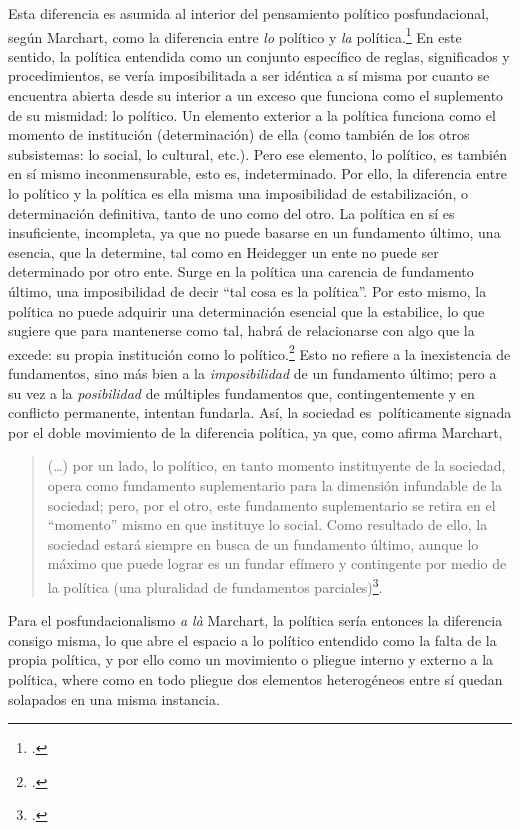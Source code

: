 Esta diferencia es asumida al interior del pensamiento político posfundacional, según Marchart, como la diferencia entre \emph{lo} político y \emph{la} política.\footcite{@7093-MARCHART2009} En este sentido, la política entendida como un conjunto específico de reglas, significados y procedimientos, se vería imposibilitada a ser idéntica a sí misma por cuanto se encuentra abierta desde su interior a un exceso que funciona como el suplemento de su mismidad: lo político. Un elemento exterior a la política funciona como el momento de institución (determinación) de ella (como también de los otros subsistemas: lo social, lo cultural, etc.). Pero ese elemento, lo político, es también en sí mismo inconmensurable, esto es, indeterminado. Por ello, la diferencia entre lo político y la política es ella misma una imposibilidad de estabilización, o determinación definitiva, tanto de uno como del otro. La política en sí es insuficiente, incompleta, ya que no puede basarse en un fundamento último, una esencia, que la determine, tal como en Heidegger un ente no puede ser determinado por otro ente. Surge en la política una carencia de fundamento último, una imposibilidad de decir \enquote{tal cosa es la política}. Por esto mismo, la política no puede adquirir una determinación esencial que la estabilice, lo que sugiere que para mantenerse como tal, habrá de relacionarse con algo que la excede: su propia institución como lo político.\footcite[19--20]{@7093-MARCHART2009} Esto no refiere a la inexistencia de fundamentos, sino más bien a la \emph{imposibilidad} de un fundamento último; pero a su vez a la \emph{posibilidad} de múltiples fundamentos que, contingentemente y en conflicto permanente, intentan fundarla. Así, la sociedad es~políticamente signada por el doble movimiento de la diferencia política, ya que, como afirma Marchart,

\begin{quote}
(\ldots) por un lado, lo político, en tanto momento instituyente de la sociedad, opera como fundamento suplementario para la dimensión infundable de la sociedad; pero, por el otro, este fundamento suplementario se retira en el \enquote{momento} mismo en que instituye lo social. Como resultado de ello, la sociedad estará siempre en busca de un fundamento último, aunque lo máximo que puede lograr es un fundar efímero y contingente por medio de la política (una pluralidad de fundamentos parciales)\footcite[23]{@7093-MARCHART2009}.
\end{quote}

Para el posfundacionalismo \emph{a là} Marchart, la política sería entonces la diferencia consigo misma, lo que abre el espacio a lo político entendido como la falta de la propia política, y por ello como un movimiento o pliegue interno y externo a la política, where como en todo pliegue dos elementos heterogéneos entre sí quedan solapados en una misma instancia.

